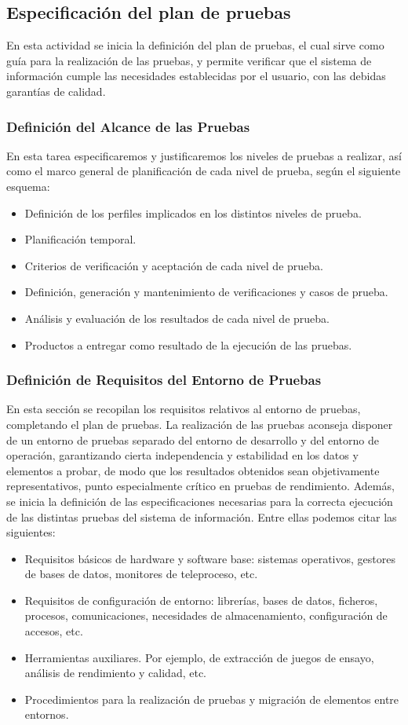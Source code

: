 \documentclass[11pt,a4paper,spanish,twoside]{report}
\begin{document}
\subsection{Especificación del plan de pruebas}
En esta actividad se inicia la definición del plan de pruebas, el cual sirve
como guía para la realización de las pruebas, y permite verificar que el
sistema de información cumple las necesidades establecidas por el usuario,
con las debidas garantías de calidad. 
\subsubsection{Definición del Alcance de las Pruebas}
En esta tarea especificaremos y justificaremos los niveles de pruebas a
realizar, así como el marco general de planificación de cada nivel de prueba,
según el siguiente esquema:
\begin{itemize}
\item Definición de los perfiles implicados en los distintos niveles de prueba.
\item Planificación temporal.
\item Criterios de verificación y aceptación de cada nivel de prueba.
\item Definición, generación y mantenimiento de verificaciones y casos de
  prueba.  
\item Análisis y evaluación de los resultados de cada nivel de prueba.
\item Productos a entregar como resultado de la ejecución de las pruebas.
\end{itemize}

\subsubsection{Definición de Requisitos del Entorno de Pruebas}
En esta sección se recopilan los requisitos relativos al entorno de pruebas,
completando el plan de pruebas. La realización de las pruebas aconseja
disponer de un entorno de pruebas separado del entorno de desarrollo y del
entorno de operación, garantizando cierta independencia y estabilidad en los
datos y elementos a probar, de modo que los resultados obtenidos sean
objetivamente representativos, punto especialmente crítico en pruebas de
rendimiento. Además, se inicia la definición de las especificaciones
necesarias para la correcta ejecución de las distintas pruebas del sistema de
información. Entre ellas podemos citar las siguientes:
\begin{itemize}
\item Requisitos básicos de hardware y software base: sistemas operativos,
  gestores de bases de datos, monitores de teleproceso, etc.
\item Requisitos de configuración de entorno: librerías, bases de datos,
  ficheros, procesos, comunicaciones, necesidades de almacenamiento,
  configuración de accesos, etc. 
\item Herramientas auxiliares. Por ejemplo, de extracción de juegos de
  ensayo, análisis de rendimiento y calidad, etc. 
\item Procedimientos para la realización de pruebas y migración de elementos
  entre entornos. 
\end{itemize}
\end{document}
